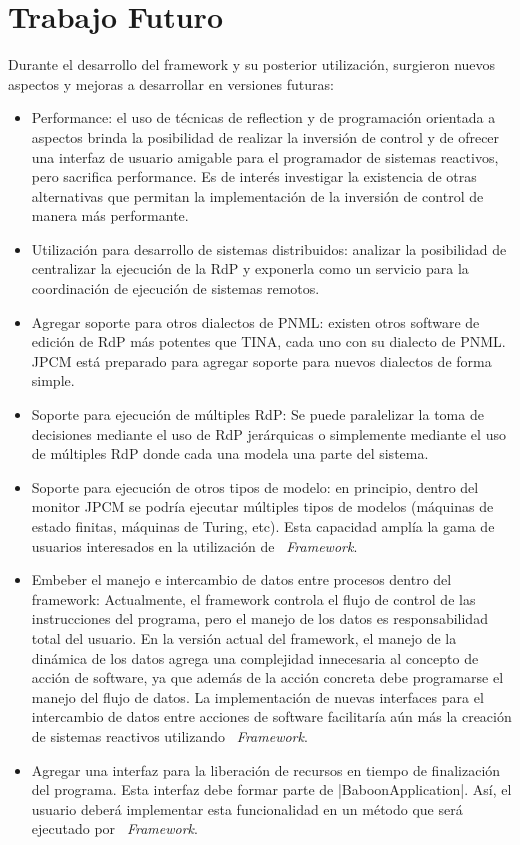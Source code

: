 \section{Trabajo Futuro}
Durante el desarrollo del framework y su posterior utilización, surgieron
nuevos aspectos y mejoras a desarrollar en versiones futuras:
\begin{itemize}
  \item Performance: el uso de técnicas de reflection y de programación
  orientada a aspectos brinda la posibilidad de realizar la inversión de control
  y de ofrecer una interfaz de usuario amigable para el programador de sistemas
  reactivos, pero sacrifica performance. Es de interés investigar la existencia 
  de otras alternativas que permitan la implementación de la inversión de
  control de manera más performante.
  \item Utilización para desarrollo de sistemas distribuidos: analizar la
  posibilidad de centralizar la ejecución de la RdP y exponerla como un servicio
  para la coordinación de ejecución de sistemas remotos.
  \item Agregar soporte para otros dialectos de PNML: existen otros software de
  edición de RdP más potentes que TINA, cada uno con su dialecto de PNML. JPCM
  está preparado para agregar soporte para nuevos dialectos de forma simple.
  \item Soporte para ejecución de múltiples RdP: Se puede paralelizar la toma
  de decisiones mediante el uso de RdP jerárquicas o simplemente mediante el
  uso de múltiples RdP donde cada una modela una parte del sistema.
  \item Soporte para ejecución de otros tipos de modelo: en principio, dentro
  del monitor JPCM se podría ejecutar múltiples tipos de modelos (máquinas de
  estado finitas, máquinas de Turing, etc). Esta capacidad amplía la gama de
  usuarios interesados en la utilización de \textit{\nombreFramework \
  Framework}.
  \item Embeber el manejo e intercambio de datos entre procesos dentro del
  framework: Actualmente, el framework controla el flujo de control de las
  instrucciones del programa, pero el manejo de los datos es responsabilidad
  total del usuario. En la versión actual del framework, el manejo de la
  dinámica de los datos agrega una complejidad innecesaria
  al concepto de acción de software, ya que además de la acción concreta debe
  programarse el manejo del flujo de datos. La implementación de nuevas
  interfaces para el intercambio de datos entre acciones de software
  facilitaría aún más la creación de sistemas reactivos utilizando
  \textit{\nombreFramework \ Framework}.
  \item Agregar una interfaz para la liberación de recursos en tiempo de
  finalización del programa. Esta interfaz debe formar parte de
  |BaboonApplication|. Así, el usuario deberá implementar esta
  funcionalidad en un método que será ejecutado por \textit{\nombreFramework \
  Framework}.
\end{itemize}


